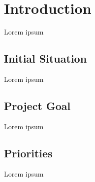 \section{Introduction}
Lorem ipsum

\subsection{Initial Situation}
Lorem ipsum

\subsection{Project Goal}
Lorem ipsum

\subsection{Priorities}
Lorem ipsum



